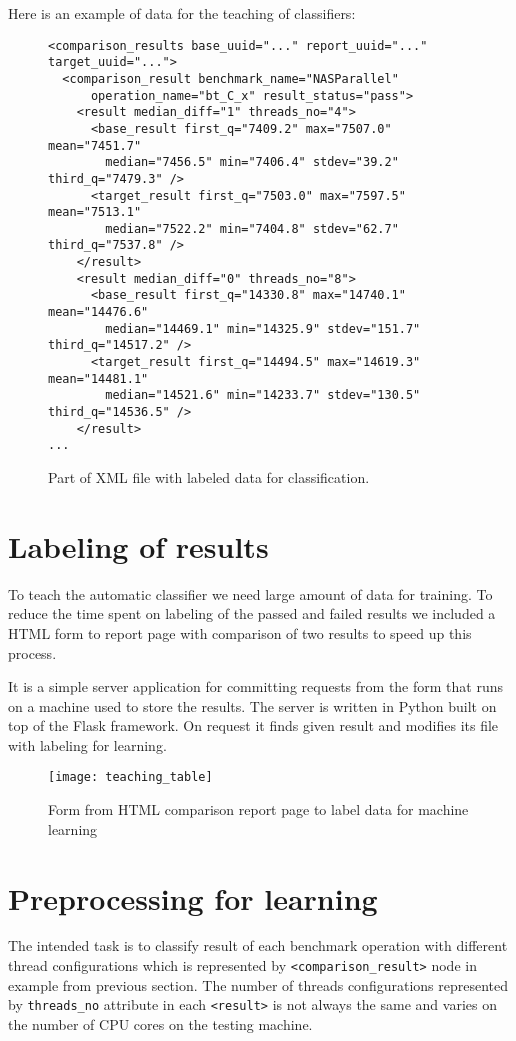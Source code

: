 Here is an example of data for the teaching of classifiers:

\begin{figure}
  \small
  \begin{verbatim}
<comparison_results base_uuid="..." report_uuid="..." target_uuid="...">
  <comparison_result benchmark_name="NASParallel"
      operation_name="bt_C_x" result_status="pass">
    <result median_diff="1" threads_no="4">
      <base_result first_q="7409.2" max="7507.0" mean="7451.7"
        median="7456.5" min="7406.4" stdev="39.2" third_q="7479.3" />
      <target_result first_q="7503.0" max="7597.5" mean="7513.1"
        median="7522.2" min="7404.8" stdev="62.7" third_q="7537.8" />
    </result>
    <result median_diff="0" threads_no="8">
      <base_result first_q="14330.8" max="14740.1" mean="14476.6"
        median="14469.1" min="14325.9" stdev="151.7" third_q="14517.2" />
      <target_result first_q="14494.5" max="14619.3" mean="14481.1"
        median="14521.6" min="14233.7" stdev="130.5" third_q="14536.5" />
    </result>
...
  \end{verbatim}
  \normalsize
  \caption{Part of XML file with labeled data for classification.}
\end{figure}

\section{Labeling of results}
To teach the automatic classifier we need large amount of data for training. To
reduce the time spent on labeling of the passed and failed results we included a
HTML form to report page with comparison of two results to speed up this process.

It is a simple server application for committing requests from the form that
runs on a machine used to store the results. The server is written in Python
built on top of the Flask framework. On request it finds given result and modifies
its file with labeling for learning.


\begin{figure}
  \centering
  \texttt{[image: teaching\_table]}
  \caption{Form from HTML comparison report page to label data for machine learning}
\end{figure}

\section{Preprocessing for learning} \label{sec:learn_preprocess}
The intended task is to classify result of each benchmark operation with
different thread configurations which is represented by
\texttt{<comparison\_result>} node in example from previous section. The number
of threads configurations represented by \texttt{threads\_no} attribute in each
\texttt{<result>} is not always the same and varies on the number of CPU cores
on the testing machine.

